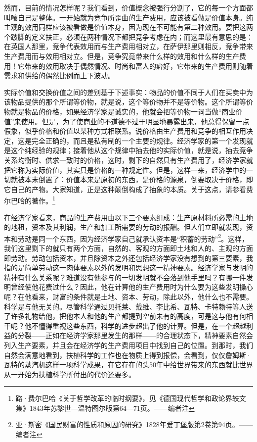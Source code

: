 \documentclass[a4paper,twoside,12pt]{ctexart}
\begin{document}
然而，目前的情况怎样呢？我们看到，价值概念被强行分割了，它的每一个方面都叫嚷自己是整体。一开始就为竞争所歪曲的生产费用，应该被看做是价值本身。纯主观的效用同样应该被看做是价值本身，因为现在不可能有第二种效用。要把这两个跛脚的定义扶正，必须在两种情况下都把竞争考虑在内；而这里最有意思的是：在英国人那里，竞争代表效用而与生产费用相对立，在萨伊那里则相反，竞争带来生产费用而与效用相对立。但是，竞争究竟带来什么样的效用和什么样的生产费用！它带来的效用取决于偶然情况、时尚和富人的癖好，它带来的生产费用则随着需求和供给的偶然比例而上下波动。

实际价值和交换价值之间的差别基于下述事实：物品的价值不同于人们在买卖中为该物品提供的那个所谓等价物，就是说，这个等价物并不是等价物。这个所谓等价物就是物品的价格，如果经济学家是诚实的，他就会把等价物一词当做“商业价值”来使用。但是，为了使商业的不道德不过于明显地暴露出来，他总得保留一点假象，似乎价格和价值以某种方式相联系。说价格由生产费用和竞争的相互作用决定，这是完全正确的，而且是私有制的一个主要的规律。经济学家的第一个发现就是这个纯经验的规律；接着他从这个规律中抽去他的实际价值，就是说，抽去竞争关系均衡时、供求一致时的价格，这时，剩下的自然只有生产费用了，经济学家就把它称为实际价值，其实只是价格的一种规定性。但是，这样一来，经济学中的一切就被本末倒置了：价值本来是原初的东西，是价格的源泉，倒要取决于价格，即它自己的产物。大家知道，正是这种颠倒构成了抽象的本质。关于这点，请参看费尔巴哈的著作。\footnote{路·费尔巴哈《关于哲学改革的临时纲要》，见《德国现代哲学和政论界轶文集》1843年苏黎世—温特图尔版第64—71页。——编者注}

在经济学家看来，商品的生产费用由以下三个要素组成：生产原材料所必需的土地的地租，资本及其利润，生产和加工所需要的劳动的报酬。但人们立即就发现，资本和劳动是同一个东西，因为经济学家自己就承认资本是“积蓄的劳动”\footnote{亚·斯密《国民财富的性质和原因的研究》1828年爱丁堡版第2卷第94页。——编者注}。这样，我们这里剩下的就只有两个方面，自然的、客观的方面即土地和人的、主观的方面即劳动。劳动包括资本，并且除资本之外还包括经济学家没有想到的第三要素，我指的是简单劳动这一肉体要素以外的发明和思想这一精神要素。经济学家与发明的精神有什么关系呢？难道没有他参与的一切发明就不会落到他手里吗？有哪一件发明曾经使他花费过什么？因此，他在计算他的生产费用时为什么要为这些发明操心呢？在他看来，财富的条件就是土地、资本、劳动，除此以外，他什么也不需要。科学是与他无关的。尽管科学通过贝托莱、戴维、李比希、瓦特、卡特赖特等人送了许多礼物给他，把他本人和他的生产都提到空前未有的高度，可是这与他有何相干呢？他不懂得重视这些东西，科学的进步超出了他的计算。但是，在一个超越利益的分裂——正如在经济学家那里发生的那样——的合理状态下，精神要素自然会列入生产要素，并且会在经济学的生产费用项目中找到自己的位置。到那时，我们自然会满意地看到，扶植科学的工作也在物质上得到报偿，会看到，仅仅詹姆斯·瓦特的蒸汽机这样一项科学成果，在它存在的头50年中给世界带来的东西就比世界从一开始为扶植科学所付出的代价还要多。
\end{document}
